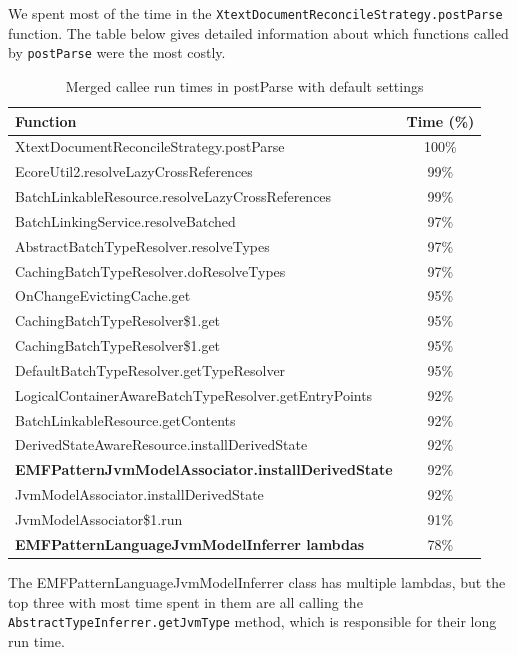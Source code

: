 \documentclass[11pt,a4paper,oneside]{report}
\begin{document}
We spent most of the time in the
\texttt{XtextDocumentReconcileStrategy.postParse} function. The table below
gives detailed information about which functions called by \texttt{postParse}
were the most costly.

\begin{table}[ht]
    \footnotesize
    \centering
    \begin{tabular}{ l c }
        \toprule
        Function & Time (\%) \\
        \midrule
        XtextDocumentReconcileStrategy.postParse & 100\% \\
        EcoreUtil2.resolveLazyCrossReferences & 99\% \\
        BatchLinkableResource.resolveLazyCrossReferences & 99\% \\
        BatchLinkingService.resolveBatched & 97\% \\
        AbstractBatchTypeResolver.resolveTypes & 97\% \\
        CachingBatchTypeResolver.doResolveTypes & 97\% \\
        OnChangeEvictingCache.get & 95\% \\
        CachingBatchTypeResolver\$1.get & 95\% \\
        CachingBatchTypeResolver\$1.get & 95\% \\
        DefaultBatchTypeResolver.getTypeResolver & 95\% \\
        LogicalContainerAwareBatchTypeResolver.getEntryPoints & 92\% \\
        BatchLinkableResource.getContents & 92\% \\
        DerivedStateAwareResource.installDerivedState & 92\% \\
        \textbf{EMFPatternJvmModelAssociator.installDerivedState} & 92\% \\
        JvmModelAssociator.installDerivedState & 92\% \\
        JvmModelAssociator\$1.run & 91\% \\
        \textbf{EMFPatternLanguageJvmModelInferrer lambdas} & 78\% \\
        \bottomrule
    \end{tabular}
    \caption{Merged callee run times in postParse with default settings}
    \label{tab:postparse-default}
\end{table}

The EMFPatternLanguageJvmModelInferrer class has multiple lambdas, but the top
three with most time spent in them are all calling the
\texttt{AbstractTypeInferrer.getJvmType} method, which is responsible for their
long run time.
\end{document}
